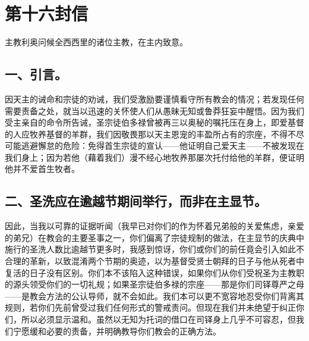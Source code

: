 

\section{第十六封信}

主教利奥问候全西西里的诸位主教，在主内致意。\par


\subsection{一、引言。}

因天主的诫命和宗徒的劝诫，我们受激励要谨慎看守所有教会的情况；若发现任何需要责备之处，就当以迅速的关怀使人们从愚昧无知或鲁莽狂妄中醒悟。因为我们受主亲自的命令所告诫，圣宗徒伯多禄曾被再三以奥秘的嘱托压在身上，即爱基督的人应牧养基督的羊群，我们因敬畏那以天主恩宠的丰盈所占有的宗座，不得不尽可能逃避懈怠的危险：免得首生宗徒的宣认——他证明自己爱天主——不被发现在我们身上；因为若他（藉着我们）漫不经心地牧养那屡次托付给他的羊群，便证明他并不爱首生牧者。\par


\subsection{二、圣洗应在逾越节期间举行，而非在主显节。}

因此，当我以可靠的证据听闻（我早已对你们的作为怀着兄弟般的关爱焦虑，亲爱的弟兄）在教会的主要圣事之一，你们偏离了宗徒规制的做法，在主显节的庆典中施行的圣洗人数比逾越节更多时，我感到惊讶，你们或你们的前任竟会引入如此不合理的革新，以致混淆两个节期的奥迹，以为基督受贤士朝拜的日子与他从死者中复活的日子没有区别。你们本不该陷入这种错误，如果你们从你们受祝圣为主教职的源头领受你们的一切礼规；如果圣宗徒伯多禄的宗座——那是你们司铎尊严之母——是教会方法的公认导师，就不会如此。我们本可以更不宽容地忍受你们背离其规则，若你们先前曾受过我们任何形式的警戒责问。但现在我们并未绝望于纠正你们，所以必须显示温和。虽然以无知为托词的借口在司铎身上几乎不可容忍，但我们宁愿缓和必要的责备，并明确教导你们教会的正确方法。\par


